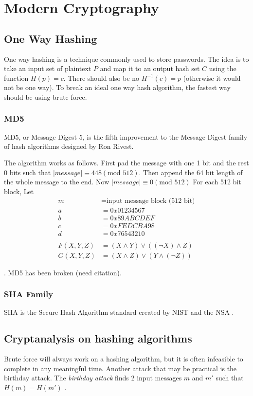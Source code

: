 \documentclass[12pt]{article}
\begin{document}
\section{Modern Cryptography}
\subsection{One Way Hashing}
One way hashing is a technique commonly used to store passwords. The idea is to take an input set of plaintext $P$ and map it to an output hash set $C$ using the function $H(p)=c$. There should also be no $H^{-1}(c)=p$ (otherwise it would not be one way). To break an ideal one way hash algorithm, the fastest way should be using brute force.
\subsubsection{MD5}
MD5, or Message Digest 5, is the fifth improvement to the Message Digest family of hash algorithms designed by Ron Rivest.

The algorithm works as follows.
First pad the message with one 1 bit and the rest 0 bits such that $\left|message\right|\equiv448(\text{mod }512)$. Then append the 64 bit length of the whole message to the end. Now $\left|message\right|\equiv0(\text{mod }512)$
For each 512 bit block, Let
\begin{align*}
m&=\text{input message block (512 bit)}\\
a&=0x01234567\\
b&=0x89ABCDEF\\
c&=0xFEDCBA98\\
d&=0x76543210\\\\
F(X,Y,Z)&=(X\land Y)\lor((\lnot X)\land Z)\\
G(X,Y,Z)&=(X\land Z)\lor(Y\land(\lnot Z))
\end{align*}



\cite[p. 436]{appcrypt}. MD5 has been broken (need citation).
\subsubsection{SHA Family}
SHA is the Secure Hash Algorithm standard created by NIST and the NSA \cite{appcrypt}.
\subsection{Cryptanalysis on hashing algorithms}
Brute force will always work on a hashing algorithm, but it is often infeasible to complete in any meaningful time. Another attack that may be practical is the birthday attack. The \textit{birthday attack} finds 2 input messages $m$ and $m'$ such that $H(m)=H(m')$ \cite{appcrypt}.
\end{document}
